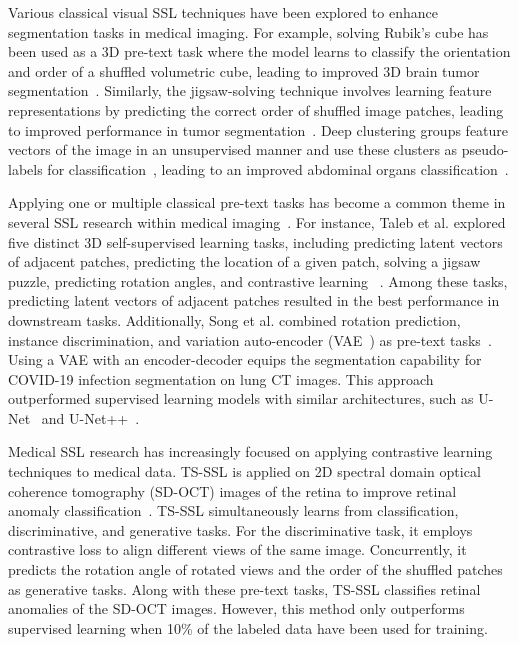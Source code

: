 \documentclass[a4paper,11pt,oneside]{report}
\begin{document}
Various classical visual SSL techniques have been explored to enhance segmentation tasks in medical imaging. For example, solving Rubik's cube has been used as a 3D pre-text task where the model learns to classify the orientation and order of a shuffled volumetric cube, leading to improved 3D brain tumor segmentation~\cite{Zhuang2019}. Similarly, the jigsaw-solving technique involves learning feature representations by predicting the correct order of shuffled image patches, leading to improved performance in tumor segmentation~\cite{Taleb2020}. Deep clustering groups feature vectors of the image in an unsupervised manner and use these clusters as pseudo-labels for classification~\cite{Caron2018}, leading to an improved abdominal organs classification~\cite{Dadoun2023}.

Applying one or multiple classical pre-text tasks has become a common theme in several SSL research within medical imaging~\cite{Zhou2021, Zhang2021, Dufumier2021}. For instance, Taleb et al. explored five distinct 3D self-supervised learning tasks, including predicting latent vectors of adjacent patches, predicting the location of a given patch, solving a jigsaw puzzle, predicting rotation angles, and contrastive learning ~\cite{Taleb2020}. Among these tasks, predicting latent vectors of adjacent patches resulted in the best performance in downstream tasks. Additionally, Song et al. combined rotation prediction, instance discrimination, and variation auto-encoder (VAE~\cite{Kingma2013}) as pre-text tasks~\cite{Song2022}. Using a VAE with an encoder-decoder equips the segmentation capability for COVID-19 infection segmentation on lung CT images. This approach outperformed supervised learning models with similar architectures, such as U-Net~\cite{Ronneberger2015} and U-Net++~\cite{Zhou2020}.

Medical SSL research has increasingly focused on applying contrastive learning techniques to medical data.  TS-SSL is applied on 2D spectral domain optical coherence tomography (SD-OCT) images of the retina to improve retinal anomaly classification~\cite{Zhang2021}. TS-SSL simultaneously learns from classification, discriminative, and generative tasks. For the discriminative task, it employs contrastive loss to align different views of the same image. Concurrently, it predicts the rotation angle of rotated views and the order of the shuffled patches as generative tasks. Along with these pre-text tasks, TS-SSL classifies retinal anomalies of the SD-OCT images. However, this method only outperforms supervised learning when 10\% of the labeled data have been used for training. 
\end{document}
